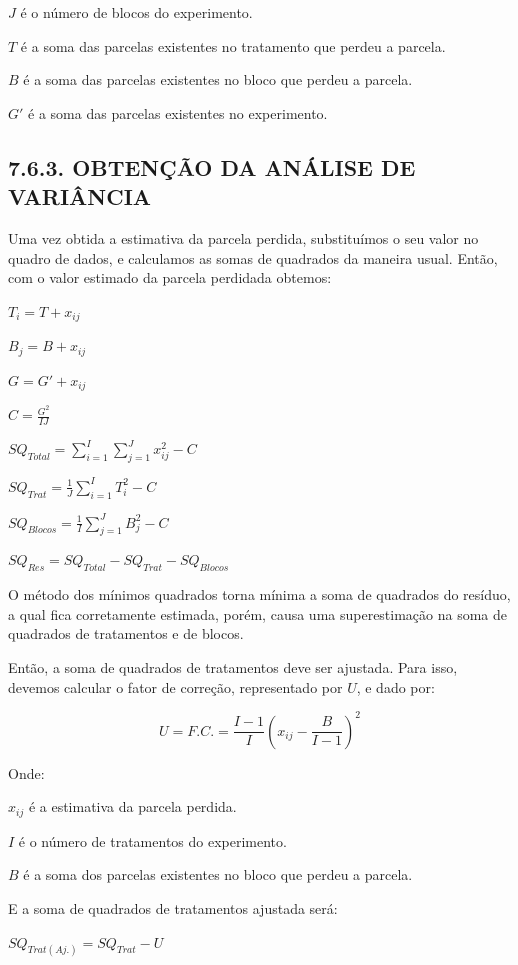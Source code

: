 \documentclass[
]{book}
\begin{document}
\(J\) é o número de blocos do experimento.

\(T\) é a soma das parcelas existentes no tratamento que perdeu a parcela.

\(B\) é a soma das parcelas existentes no bloco que perdeu a parcela.

\(G'\) é a soma das parcelas existentes no experimento.

\hypertarget{obtenuxe7uxe3o-da-anuxe1lise-de-variuxe2ncia-1}{%
\subsection{7.6.3. OBTENÇÃO DA ANÁLISE DE VARIÂNCIA}\label{obtenuxe7uxe3o-da-anuxe1lise-de-variuxe2ncia-1}}

Uma vez obtida a estimativa da parcela perdida, substituímos o seu valor no quadro de dados, e calculamos as somas de quadrados da maneira usual. Então, com o valor estimado da parcela perdidada obtemos:

\(T_{i}=T+x_{ij}\)

\(B_{j}=B+x_{ij}\)

\(G=G'+x_{ij}\)

\(C=\frac{G^2}{IJ}\)

\(SQ_{Total}=\sum_{i=1}^I\sum_{j=1}^Jx_{ij}^2-C\)

\(SQ_{Trat}=\frac{1}{J}\sum_{i=1}^IT_{i}^2-C\)

\(SQ_{Blocos}=\frac{1}{I}\sum_{j=1}^JB_{j}^2-C\)

\(SQ_{Res}=SQ_{Total}-SQ_{Trat}-SQ_{Blocos}\)

O método dos mínimos quadrados torna mínima a soma de quadrados do resíduo, a qual fica corretamente estimada, porém, causa uma superestimação na soma de quadrados de tratamentos e de blocos.

Então, a soma de quadrados de tratamentos deve ser ajustada. Para isso, devemos calcular o fator de correção, representado por \(U\), e dado por:

\[
U=F.C. =\frac{I-1}{I}\left(x_{ij}-\frac{B}{I-1}\right)^2
\]

Onde:

\(x_{ij}\) é a estimativa da parcela perdida.

\(I\) é o número de tratamentos do experimento.

\(B\) é a soma dos parcelas existentes no bloco que perdeu a parcela.

E a soma de quadrados de tratamentos ajustada será:

\(SQ_{Trat(Aj.)}=SQ_{Trat}-U\)
\end{document}
